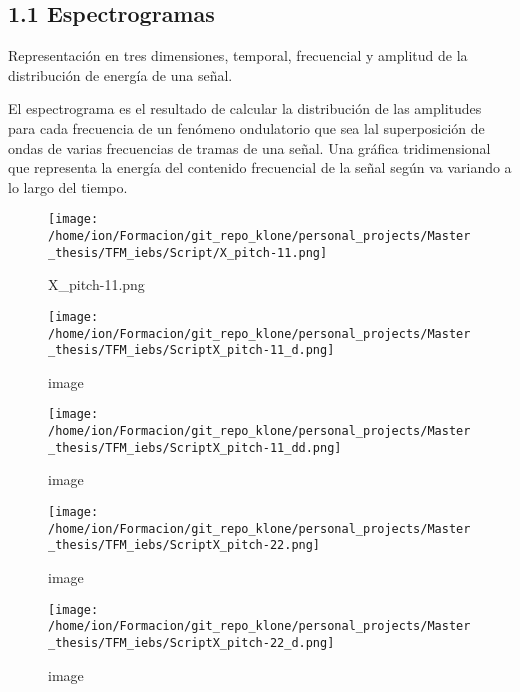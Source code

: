 \documentclass[
]{article}
\begin{document}
\newpage

\hypertarget{espectrogramas}{%
\subsection{1.1 Espectrogramas}\label{espectrogramas}}

Representación en tres dimensiones, temporal, frecuencial y amplitud de
la distribución de energía de una señal.

El espectrograma es el resultado de calcular la distribución de las
amplitudes para cada frecuencia de un fenómeno ondulatorio que sea lal
superposición de ondas de varias frecuencias de tramas de una señal. Una
gráfica tridimensional que representa la energía del contenido
frecuencial de la señal según va variando a lo largo del tiempo.

\begin{figure}
\centering
\texttt{[image: /home/ion/Formacion/git\_repo\_klone/personal\_projects/Master\_thesis/TFM\_iebs/Script/X\_pitch-11.png]}
\caption{X\_pitch-11.png}
\end{figure}

\vspace{15pt}

\begin{figure}
\centering
\texttt{[image: /home/ion/Formacion/git\_repo\_klone/personal\_projects/Master\_thesis/TFM\_iebs/ScriptX\_pitch-11\_d.png]}
\caption{image}
\end{figure}

\vspace{15pt}

\begin{figure}
\centering
\texttt{[image: /home/ion/Formacion/git\_repo\_klone/personal\_projects/Master\_thesis/TFM\_iebs/ScriptX\_pitch-11\_dd.png]}
\caption{image}
\end{figure}

\vspace{15pt}

\begin{figure}
\centering
\texttt{[image: /home/ion/Formacion/git\_repo\_klone/personal\_projects/Master\_thesis/TFM\_iebs/ScriptX\_pitch-22.png]}
\caption{image}
\end{figure}

\vspace{15pt}

\begin{figure}
\centering
\texttt{[image: /home/ion/Formacion/git\_repo\_klone/personal\_projects/Master\_thesis/TFM\_iebs/ScriptX\_pitch-22\_d.png]}
\caption{image}
\end{figure}
\end{document}
